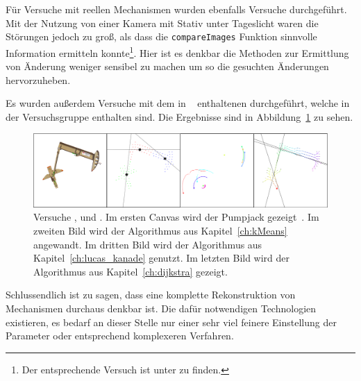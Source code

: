 Für Versuche mit reellen Mechanismen wurden ebenfalls Versuche durchgeführt.
Mit der Nutzung von einer Kamera mit Stativ unter Tageslicht waren die Störungen jedoch zu gro{\ss}, als dass die \lstinline{compareImages} Funktion sinnvolle Information ermitteln konnte\footnote{Der entsprechende Versuch ist unter  zu finden.}.
Hier ist es denkbar die Methoden zur Ermittlung von Änderung weniger sensibel zu machen um so die gesuchten Änderungen hervorzuheben.

Es wurden au{\ss}erdem Versuche mit dem in ~\cite{Uhlig2019} enthaltenen  durchgeführt, welche in der Versuchsgruppe  enthalten sind.
Die Ergebnisse sind in Abbildung~\ref{fig:bilder2} zu sehen.

\begin{figure}
    \centering
    \includegraphics[width=\textwidth]{gfx/bilder2_edited.png}
    \caption[Versuche ,  und ]{Versuche ,  und . Im ersten Canvas wird der Pumpjack gezeigt~\cite{Uhlig2021}. Im zweiten Bild wird der  Algorithmus aus Kapitel~\ref{ch:kMeans} angewandt. Im dritten Bild wird der  Algorithmus aus Kapitel~\ref{ch:lucas_kanade} genutzt. Im letzten Bild wird der  Algorithmus aus Kapitel~\ref{ch:dijkstra} gezeigt.}
    \label{fig:bilder2}
\end{figure}

Schlussendlich ist zu sagen, dass eine komplette Rekonstruktion von Mechanismen durchaus denkbar ist.
Die dafür notwendigen Technologien existieren, es bedarf an dieser Stelle nur einer sehr viel feinere Einstellung der Parameter oder entsprechend komplexeren Verfahren.
